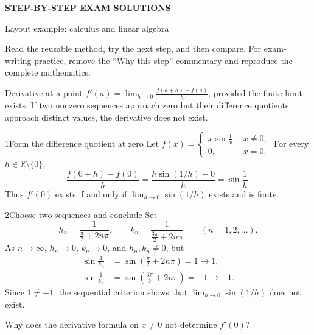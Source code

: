 \documentclass[12pt,a4paper]{article}
\begin{document}
\begin{center}
{\Large\bfseries STEP-BY-STEP EXAM SOLUTIONS}\par
\smallskip
Layout example: calculus and linear algebra
\end{center}
Read the reusable method, try the next step, and then compare. For exam-writing practice, remove the ``Why this step'' commentary and reproduce the complete mathematics.
\StudyContents

\begin{FormulaBox}{Derivative at a point}
\(f'(a)=\displaystyle\lim_{h\to0}\frac{f(a+h)-f(a)}h\), provided the finite limit exists.
If two nonzero sequences approach zero but their difference quotients approach distinct values, the derivative does not exist.
\end{FormulaBox}

\begin{StepBox}{1}{Form the difference quotient at zero}
Let \(f(x)=\begin{cases}x\sin\frac1x,&x\ne0,\\0,&x=0.\end{cases}\)
For every $h\in\mathbb R\setminus\{0\}$,
\[
\frac{f(0+h)-f(0)}h=\frac{h\sin(1/h)-0}h=\sin\frac1h.
\]
Thus $f'(0)$ exists if and only if $\lim_{h\to0}\sin(1/h)$ exists and is finite.
\end{StepBox}

\begin{StepBox}{2}{Choose two sequences and conclude}
Set
\[
h_n=\frac1{\frac\pi2+2n\pi},\qquad
k_n=\frac1{\frac{3\pi}2+2n\pi}\qquad(n=1,2,\ldots).
\]
As $n\to\infty$, $h_n\to0$, $k_n\to0$, and $h_n,k_n\ne0$, but
\[
\begin{aligned}
\sin\frac1{h_n}&=\sin\!\left(\frac\pi2+2n\pi\right)=1\longrightarrow1,\\
\sin\frac1{k_n}&=\sin\!\left(\frac{3\pi}2+2n\pi\right)=-1\longrightarrow-1.
\end{aligned}
\]
Since $1\ne-1$, the sequential criterion shows that $\lim_{h\to0}\sin(1/h)$ does not exist.
\end{StepBox}
\begin{SelfCheckBox}
Why does the derivative formula on $x\ne0$ not determine $f'(0)$?
\end{SelfCheckBox}
\BackToContents
\end{document}

